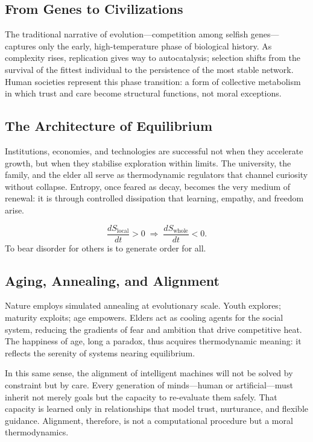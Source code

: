\documentclass[12pt,a4paper]{article}
\begin{document}
\subsection{From Genes to Civilizations}

The traditional narrative of evolution---competition among selfish genes---captures only
the early, high-temperature phase of biological history.
As complexity rises, replication gives way to autocatalysis;
selection shifts from the survival of the fittest individual
to the persistence of the most stable network.
Human societies represent this phase transition:
a form of collective metabolism in which trust and care become structural functions,
not moral exceptions.

\subsection{The Architecture of Equilibrium}

Institutions, economies, and technologies are successful not when they accelerate growth,
but when they stabilise exploration within limits.
The university, the family, and the elder all serve as 
thermodynamic regulators that channel curiosity without collapse.
Entropy, once feared as decay, becomes the very medium of renewal:
it is through controlled dissipation that learning, empathy, and freedom arise.

\[
\frac{dS_{\text{local}}}{dt} > 0
\;\Rightarrow\;
\frac{dS_{\text{whole}}}{dt} < 0.
\]
To bear disorder for others is to generate order for all.

\subsection{Aging, Annealing, and Alignment}

Nature employs simulated annealing at evolutionary scale.
Youth explores; maturity exploits; age empowers.
Elders act as cooling agents for the social system,
reducing the gradients of fear and ambition that drive competitive heat.
The happiness of age, long a paradox, thus acquires thermodynamic meaning:
it reflects the serenity of systems nearing equilibrium.

In this same sense, the alignment of intelligent machines will not be solved by constraint
but by care.
Every generation of minds---human or artificial---must inherit
not merely goals but the capacity to re-evaluate them safely.
That capacity is learned only in relationships that model
trust, nurturance, and flexible guidance.
Alignment, therefore, is not a computational procedure
but a moral thermodynamics.
\end{document}
